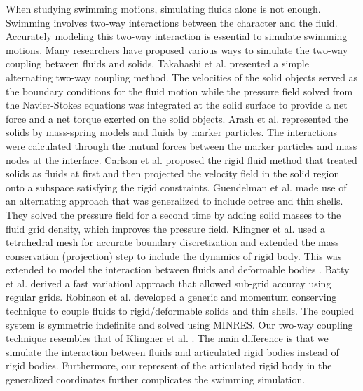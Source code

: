 When studying swimming motions, simulating fluids alone is not enough. Swimming involves two-way interactions between the character and the fluid. Accurately modeling this two-way interaction is essential to simulate swimming motions. Many researchers have proposed various ways to
simulate the two-way coupling between fluids and solids.  Takahashi et al. \cite{takahashi2002fluid-rigid}
presented a simple alternating two-way coupling method. The velocities of the solid
objects served as the boundary conditions for the fluid motion while the
pressure field solved from the Navier-Stokes equations was integrated at the
solid surface to provide a net force and a net torque exerted on the solid
objects. Arash et al. \cite{arash2003simulatingfluid-solid} represented the solids by mass-spring models and fluids by marker particles.  The interactions were calculated through the mutual forces between the marker particles and mass nodes at the interface. Carlson et al. \cite{carlson2004rigid} proposed the rigid
fluid method that treated solids as fluids at first
and then projected the velocity field in the solid region onto a subspace
satisfying the rigid constraints. Guendelman et al. \cite{guendelman2005thin} made use of an
alternating approach that was generalized to include octree and thin
shells.  They solved the pressure field for a
second time by adding solid masses to the fluid grid density, which improves
the pressure field. Klingner et al. \cite{klingner2006mesh} used a tetrahedral mesh for accurate boundary discretization and extended the mass conservation (projection) step
to include the dynamics of rigid body. This was extended to model the interaction between fluids and deformable bodies \cite{chentanez2006simultaneous}. Batty et al. \cite{batty2007fast} derived a fast variationl approach that allowed sub-grid accuray using regular grids. Robinson et al. \cite{robinson2008two} developed a generic and momentum
conserving technique to couple fluids to rigid/deformable solids and thin
shells. The coupled system is symmetric indefinite and solved using MINRES. Our two-way coupling technique resembles that of Klingner et al. \cite{klingner2006mesh}. The main difference is that we simulate the interaction between fluids and articulated rigid bodies instead of rigid bodies. Furthermore, our represent of the articulated rigid body in the generalized coordinates further complicates the swimming simulation.

